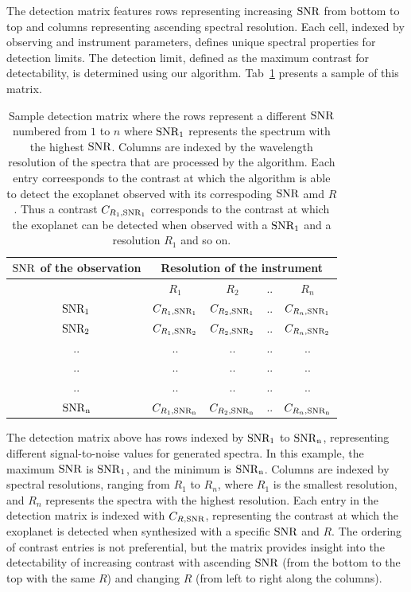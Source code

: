 The detection matrix features rows representing increasing $\rm{SNR}$ from bottom to top and columns representing ascending spectral resolution. Each cell, indexed by observing and instrument parameters, defines unique spectral properties for detection limits. The detection limit, defined as the maximum contrast for detectability, is determined using our algorithm. Tab~\ref{tab:sample_detmat} presents a sample of this matrix.
\begin{table}[!ht]
    \centering
    \begin{tabular}{||c|c|c|c|c||}
    \hline
    \hline
         {$\rm{SNR}$ of the observation}& \multicolumn{4}{c}{Resolution of the instrument}\\
         \hline
                  &  $R_1$              &$R_2$        &..&$R_n$\\
         \hline
         $\rm{SNR_1}$&$C_{R_1,\rm{SNR_1}}$&$C_{R_2,\rm{SNR_1}}$&..&$C_{R_n,\rm{SNR}_1}$\\
         \hline
         $\rm{SNR_{2}}$&$C_{R_1,\rm{SNR_2}}$&$C_{R_2,\rm{SNR_2}}$&$..$& $C_{R_n,\rm{SNR_2}}$\\
         
                ..  & .. &.. &  .. &..    \\ 
                ..    & ..  &.. &  .. &..    \\ 
                ..    & .. &.. &  .. &..    \\ 
                    \hline
        $\rm{SNR}_n$&$C_{R_1,\rm{SNR}_n}$&$C_{R_2,\rm{SNR}_n}$&..&$C_{R_n,\rm{SNR}_n}$\\
         \hline
         \hline
    \end{tabular}
    \caption{Sample detection matrix where the rows represent a different $\rm{SNR}$ numbered from $1$ to $n$ where $\rm{SNR_1}$ represents the spectrum with the highest $\rm{SNR}$.
    Columns are indexed by the wavelength resolution of the spectra that are processed by the algorithm.
    Each entry correesponds to the contrast at which the algorithm is able to detect the exoplanet observed with its correspoding $\rm{SNR}$ amd $R$.
    Thus a contrast $C_{R_1,\rm{SNR}_1}$ corresponds to the contrast at which the exoplanet can be detected when observed with a $\rm{SNR_1}$ and a resolution $R_1$ and so on.}
    \label{tab:sample_detmat}
\end{table}

The detection matrix above has rows indexed by $\rm{SNR_1}$ to $\rm{SNR}_n$, representing different signal-to-noise values for generated spectra. In this example, the maximum $\rm{SNR}$ is $\rm{SNR}_1$, and the minimum is $\rm{SNR}_n$. Columns are indexed by spectral resolutions, ranging from $R_1$ to $R_n$, where $R_1$ is the smallest resolution, and $R_n$ represents the spectra with the highest resolution.
Each entry in the detection matrix is indexed with $C_{R,\rm{SNR}}$, representing the contrast at which the exoplanet is detected when synthesized with a specific $\rm{SNR}$ and $R$. The ordering of contrast entries is not preferential, but the matrix provides insight into the detectability of increasing contrast with ascending $\rm{SNR}$ (from the bottom to the top with the same $R$) and changing $R$ (from left to right along the columns).

